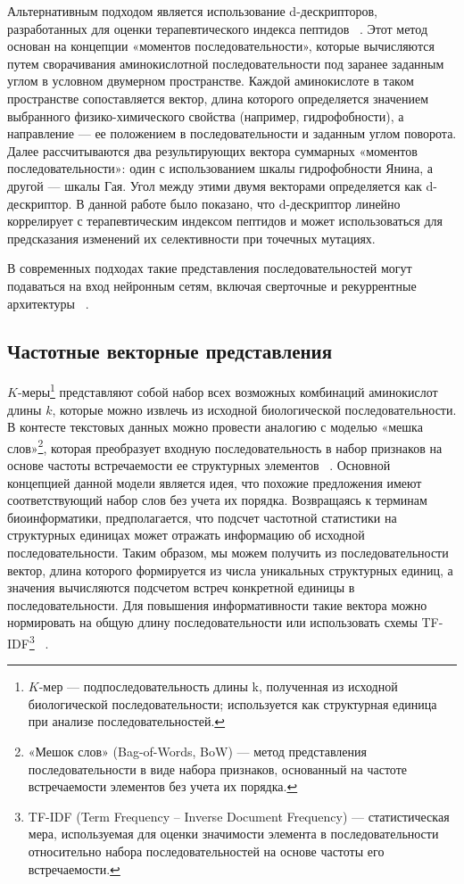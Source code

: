 \documentclass[specification,annotation,times]{itmo-student-thesis}
\begin{document}
Альтернативным подходом является использование d-дескрипторов, разработанных для оценки терапевтического индекса пептидов ~\cite{juretic2009computational}. Этот метод основан на концепции «моментов последовательности», которые вычисляются путем сворачивания аминокислотной последовательности под заранее заданным углом в условном двумерном пространстве. Каждой аминокислоте в таком пространстве сопоставляется вектор, длина которого определяется значением выбранного физико-химического свойства (например, гидрофобности), а направление — ее положением в последовательности и заданным углом поворота. Далее рассчитываются два результирующих вектора суммарных «моментов последовательности»: один с использованием шкалы гидрофобности Янина, а другой --- шкалы Гая. Угол между этими двумя векторами определяется как d-дескриптор. В данной работе было показано, что d-дескриптор линейно коррелирует с терапевтическим индексом пептидов и может использоваться для предсказания изменений их селективности при точечных мутациях.

В современных подходах такие представления последовательностей могут подаваться на вход нейронным сетям,  включая сверточные и рекуррентные архитектуры ~\cite{hakala2020neural, han2009predicting}.

\subsection{Частотные векторные представления}

$K$-меры\footnote{$K$-мер --- подпоследовательность длины k, полученная из исходной биологической последовательности; используется как структурная единица при анализе последовательностей.} представляют собой набор всех возможных комбинаций аминокислот длины $k$, которые можно извлечь из исходной биологической последовательности. В контесте текстовых данных можно провести аналогию  с моделью «мешка слов»\footnote{«Мешок слов» (Bag-of-Words, BoW) --- метод представления последовательности в виде набора признаков, основанный на частоте встречаемости элементов без учета их порядка.}, которая преобразует входную последовательность в набор признаков на основе частоты встречаемости ее структурных элементов ~\cite{ofer2021language}. Основной концепцией данной модели является идея, что похожие предложения имеют соответствующий набор слов без учета их порядка. Возвращаясь к терминам биоинформатики, предполагается, что подсчет частотной статистики на структурных единицах может отражать информацию об исходной последовательности. Таким образом, мы можем получить из последовательности вектор, длина которого формируется из числа уникальных структурных единиц, а значения вычисляются подсчетом встреч конкретной единицы в последовательности. Для повышения информативности такие вектора можно нормировать на общую длину последовательности или использовать схемы TF-IDF\footnote{TF-IDF (Term Frequency – Inverse Document Frequency) --- статистическая мера, используемая для оценки значимости элемента в последовательности относительно набора последовательностей на основе частоты его встречаемости.} ~\cite{salton1983automatic}. 
\end{document}
